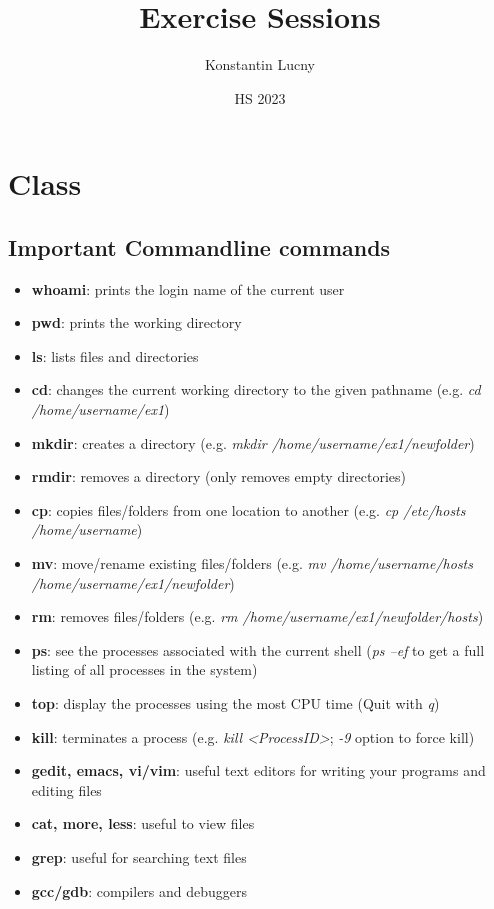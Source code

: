 \documentclass[a4paper,10pt]{article}
\title{Exercise Sessions}
\author{Konstantin Lucny}
\date{HS 2023}
\begin{document}
\maketitle
\section{Class}
\subsection{Important Commandline commands}
\begin{itemize}
    \item \textbf{whoami}: prints the login name of the current user
    \item \textbf{pwd}: prints the working directory
    \item \textbf{ls}: lists files and directories
    \item \textbf{cd}: changes the current working directory to the given pathname (e.g. \textit{cd /home/username/ex1})
    \item \textbf{mkdir}: creates a directory (e.g. \textit{mkdir /home/username/ex1/newfolder})
    \item \textbf{rmdir}: removes a directory (only removes empty directories)
    \item \textbf{cp}: copies files/folders from one location to another (e.g. \textit{cp /etc/hosts /home/username})
    \item \textbf{mv}: move/rename existing files/folders (e.g. \textit{mv /home/username/hosts /home/username/ex1/newfolder})
    \item \textbf{rm}: removes files/folders (e.g. \textit{rm /home/username/ex1/newfolder/hosts})
    \item \textbf{ps}: see the processes associated with the current shell (\textit{ps –ef} to get a full listing of all processes in the system)
    \item \textbf{top}: display the processes using the most CPU time (Quit with \textit{q})
    \item \textbf{kill}: terminates a process (e.g. \textit{kill <ProcessID>}; \textit{-9} option to force kill)
    \item \textbf{gedit, emacs, vi/vim}: useful text editors for writing your programs and editing files
    \item \textbf{cat, more, less}: useful to view files
    \item \textbf{grep}: useful for searching text files
    \item \textbf{gcc/gdb}: compilers and debuggers
\end{itemize}
\pagebreak
\end{document}
